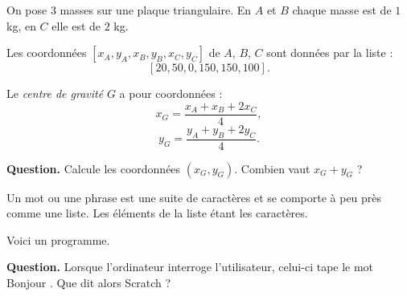\documentclass[class=report,crop=false, 12pt]{standalone}
\begin{document}


\begin{enigme}

On pose $3$ masses sur une plaque triangulaire.
En $A$ et $B$ chaque masse est de $1$ kg, en $C$ elle est de $2$ kg.




Les coordonnées $[x_A,y_A,x_B,y_B,x_C,y_C]$ de $A$, $B$, $C$ sont données par la liste :
$$[20,50,0,150,150,100].$$

Le \emph{centre de gravité} $G$ a pour coordonnées :
$$x_G = \frac{x_A+x_B+2x_C}{4},$$
$$y_G = \frac{y_A+y_B+2y_C}{4}.$$


\bigskip

\textbf{Question.} Calcule les coordonnées $(x_G,y_G)$. 
Combien vaut $x_G+y_G$ ?
 


\end{enigme}



\begin{enigme}
Un mot ou une phrase est une suite de caractères et se comporte à peu près comme une liste. Les éléments de la liste étant les caractères.


Voici un programme.

\begin{center}
\begin{scratch}
  {
  }
\end{scratch}
\end{center}


\bigskip

\textbf{Question.} Lorsque l'ordinateur interroge l'utilisateur, celui-ci tape le mot \og Bonjour \fg{}. Que dit alors Scratch ?


\end{enigme}
\end{document}
